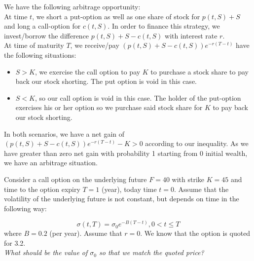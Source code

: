 \documentclass[12pt,twoside, letter]{exam}
\theoremstyle{definition}
\begin{document}
\begin{solution}
  We have the following arbitrage opportunity: \\
  At time $t$, we short a put-option as well as one share of stock for $p(t,S) + S$ and long a call-option for $c(t,S)$.
  In order to finance this strategy, we invest/borrow the difference $p(t,S) + S - c(t,S)$ with interest rate $r$. \\
  At time of maturity $T$, we receive/pay $(p(t,S) + S - c(t,S))e^{-r(T-t)}$ have the following situations:
    \begin{itemize}
      \item $S > K$, we exercise the call option to pay $K$ to purchase a stock share to pay back our stock shorting. The put option is void in this case.
      \item $S < K$, so our call option is void in this case. The holder of the put-option exercises his or her option so we purchase said stock share
        for $K$ to pay back our stock shorting.
    \end{itemize}
    In both scenarios, we have a net gain of $(p(t,S) + S - c(t,S))e^{-r(T-t)} - K > 0$ according to our inequality. As we have greater than zero net gain
    with probability 1 starting from 0 initial wealth, we have an arbitrage situation. 
\end{solution}

  \par{Consider a call option on the underlying future $F=40$ with strike $K=45$ and time to the option expiry
  $T=1$ (year), today time $t=0$. Assume that the volatility of the underlying future is not constant, but depends on time
  in the following way:}

  \begin{equation*}
    \sigma(t,T) = \sigma_0 e^{-B(T-t)}, 0 < t \leq T
  \end{equation*}
  where $B=0.2$ (per year). Assume that $r=0$. We know that the option is quoted for 3.2. \\
  \textit{What should be the value of $\sigma_0$ so that we match the quoted price?}
\end{document}
